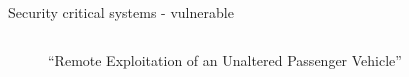 \documentclass[xcolor={x11names}]{beamer}
\begin{document}
\begin{frame}{Security critical systems - vulnerable}
\begin{columns}
\begin{column}{0.5\textwidth}
\begin{figure}
                \caption{``Remote Exploitation of an Unaltered Passenger Vehicle'' \cite{greenberg_hackers_2015,miller_remote_2015}}
                \label{jeep_offroad}
            \end{figure}
        \end{column}
    \end{columns}
\end{frame}


\end{document}
